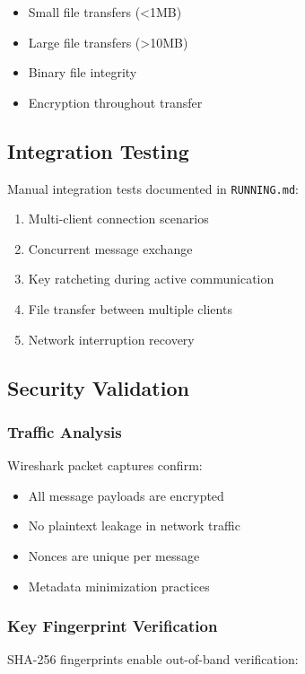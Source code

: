 \documentclass[conference]{IEEEtran}
\begin{document}
\begin{itemize}
    \item Small file transfers (<1MB)
    \item Large file transfers (>10MB)
    \item Binary file integrity
    \item Encryption throughout transfer
\end{itemize}

\subsection{Integration Testing}

Manual integration tests documented in \texttt{RUNNING.md}:

\begin{enumerate}
    \item Multi-client connection scenarios
    \item Concurrent message exchange
    \item Key ratcheting during active communication
    \item File transfer between multiple clients
    \item Network interruption recovery
\end{enumerate}

\subsection{Security Validation}

\subsubsection{Traffic Analysis}
Wireshark packet captures confirm:

\begin{itemize}
    \item All message payloads are encrypted
    \item No plaintext leakage in network traffic
    \item Nonces are unique per message
    \item Metadata minimization practices
\end{itemize}

\subsubsection{Key Fingerprint Verification}
SHA-256 fingerprints enable out-of-band verification:
\end{document}
